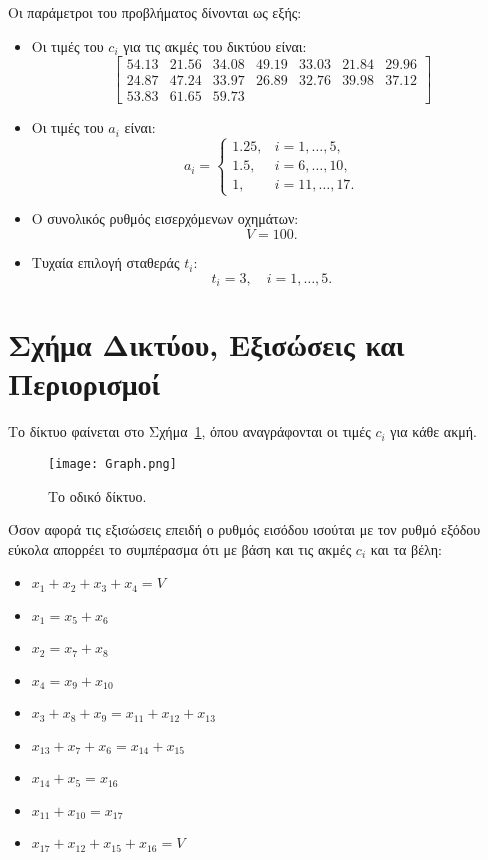 \documentclass[a4paper,12pt]{report}
\newcommand{\gr}{\selectlanguage{greek}}
\begin{document}
\vspace{0.3cm}
\hspace{-0.6cm}Οι παράμετροι του προβλήματος δίνονται ως εξής:
\begin{itemize}
    \item Οι τιμές του $c_i$ για τις ακμές του δικτύου είναι:
    \[
    \begin{bmatrix}
        54.13 & 21.56 & 34.08 & 49.19 & 33.03 & 21.84 & 29.96 \\
        24.87 & 47.24 & 33.97 & 26.89 & 32.76 & 39.98 & 37.12 \\
        53.83 & 61.65 & 59.73
    \end{bmatrix}
    \]
    \item Οι τιμές του $a_i$ είναι:
    \[
    a_i = 
    \begin{cases} 
        1.25, & i = 1, \dots, 5, \\ 
        1.5, & i = 6, \dots, 10, \\ 
        1, & i = 11, \dots, 17.
    \end{cases}
    \]
    \item Ο συνολικός ρυθμός εισερχόμενων οχημάτων:
    \[
    V = 100.
    \]
    \item Τυχαία επιλογή σταθεράς \(t_i\):
    \[
    t_i = 3, \quad i = 1, \dots, 5.
    \]
\end{itemize}

\section*{\gr Σχήμα Δικτύου, Eξισώσεις και Περιορισμοί}
Το δίκτυο φαίνεται στο Σχήμα~\ref{fig:network}, όπου αναγράφονται οι τιμές $c_i$ για κάθε ακμή.
\begin{figure}[h]
    \centering
    \texttt{[image: Graph.png]} 
    \caption{\gr Το οδικό δίκτυο.}
    \label{fig:network}
\end{figure}

\vspace{0.2cm}

\hspace{-0.6cm}Όσον αφορά τις εξισώσεις επειδή ο ρυθμός εισόδου ισούται με τον ρυθμό εξόδου εύκολα απορρέει το συμπέρασμα ότι με βάση και τις ακμές $c_i$ και τα βέλη:
\begin{itemize}
    \item \(x_1 + x_2 + x_3 + x_4 = V\)
    \item \(x_1 = x_5 + x_6\)
    \item \(x_2 = x_7 + x_8\)
    \item \(x_4 = x_9 + x_{10}\)
    \item \(x_3 + x_8 + x_9 = x_{11} + x_{12} + x_{13}\)
    \item \(x_{13} + x_7 + x_6 = x_{14} + x_{15}\)
    \item \(x_{14} + x_5 = x_{16}\)
    \item \(x_{11} + x_{10} = x_{17}\)
    \item \(x_{17} + x_{12} + x_{15} + x_{16} = V\)
\end{itemize}
\end{document}
